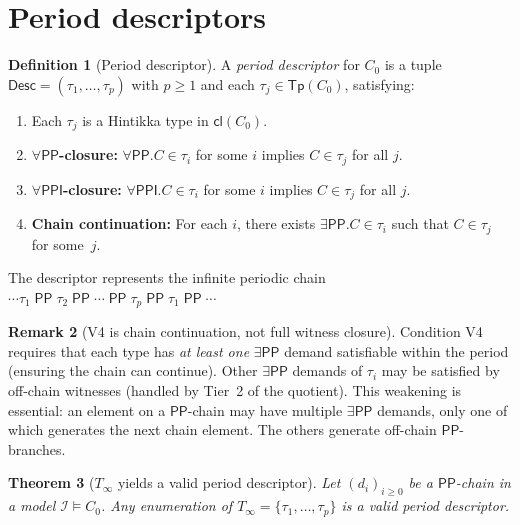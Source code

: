 \documentclass[a4paper,11pt]{article}
\newtheorem{theorem}{Theorem}[section]
\theoremstyle{definition}
\newtheorem{definition}[theorem]{Definition}
\newtheorem{remark}[theorem]{Remark}
\newcommand{\PP}{\ensuremath{\mathsf{PP}}}
\newcommand{\PPI}{\ensuremath{\mathsf{PPI}}}
\newcommand{\cl}{\ensuremath{\mathsf{cl}}}
\newcommand{\Tp}{\ensuremath{\mathsf{Tp}}}
\newcommand{\Desc}{\ensuremath{\mathsf{Desc}}}
\newcommand{\interp}{\ensuremath{\mathcal{I}}}
\begin{document}
\section{Period descriptors}\label{sec:period}

\begin{definition}[Period descriptor]\label{def:period-descriptor}
A \emph{period descriptor} for $C_0$ is a tuple
$\Desc = (\tau_1, \ldots, \tau_p)$ with $p \ge 1$ and each
$\tau_j \in \Tp(C_0)$, satisfying:
\begin{enumerate}[label=(V\arabic*)]
\item Each $\tau_j$ is a Hintikka type in $\cl(C_0)$.
\item \textbf{$\forall\PP$-closure:} $\forall\PP.C \in \tau_i$
  for some $i$ implies $C \in \tau_j$ for all $j$.
\item \textbf{$\forall\PPI$-closure:} $\forall\PPI.C \in \tau_i$
  for some $i$ implies $C \in \tau_j$ for all $j$.
\item \textbf{Chain continuation:} For each $i$, there exists
  $\exists\PP.C \in \tau_i$ such that $C \in \tau_j$ for some~$j$.
\end{enumerate}
The descriptor represents the infinite periodic chain
$\cdots \tau_1 \;\PP\; \tau_2 \;\PP\; \cdots \;\PP\; \tau_p
\;\PP\; \tau_1 \;\PP\; \cdots$
\end{definition}

\begin{remark}[V4 is chain continuation, not full witness closure]
Condition V4 requires that each type has \emph{at least one}
$\exists\PP$ demand satisfiable within the period (ensuring the chain
can continue).  Other $\exists\PP$ demands of $\tau_i$ may be
satisfied by off-chain witnesses (handled by Tier~2 of the quotient).
This weakening is essential: an element on a $\PP$-chain may have
multiple $\exists\PP$ demands, only one of which generates the next
chain element.  The others generate off-chain $\PP$-branches.
\end{remark}

\begin{theorem}[$T_\infty$ yields a valid period descriptor]
\label{thm:tinf-descriptor}
Let $(d_i)_{i \ge 0}$ be a $\PP$-chain in a model $\interp \models C_0$.
Any enumeration of $T_\infty = \{\tau_1, \ldots, \tau_p\}$ is a valid
period descriptor.
\end{theorem}
\end{document}
